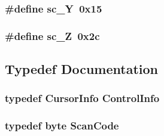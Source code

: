 \label{ID__IN_8H_a304f258a8d166ad1d2209daf57fc4db3}
\hypertarget{ID__IN_8H_a5f6c1e65d11139cad55c9235f7cc3825}{
\subsubsection[{sc\_\-Y}]{\setlength{\rightskip}{0pt plus 5cm}\#define sc\_\-Y~0x15}}
\label{ID__IN_8H_a5f6c1e65d11139cad55c9235f7cc3825}
\hypertarget{ID__IN_8H_abdfe2ea5cfd62dcfa591abdcaed59e6d}{
\subsubsection[{sc\_\-Z}]{\setlength{\rightskip}{0pt plus 5cm}\#define sc\_\-Z~0x2c}}
\label{ID__IN_8H_abdfe2ea5cfd62dcfa591abdcaed59e6d}


\subsection{Typedef Documentation}
\hypertarget{ID__IN_8H_ae2fe25e28b168383aaa3ab117709fd1c}{
\subsubsection[{ControlInfo}]{\setlength{\rightskip}{0pt plus 5cm}typedef {\bf CursorInfo} {\bf ControlInfo}}}
\label{ID__IN_8H_ae2fe25e28b168383aaa3ab117709fd1c}
\hypertarget{ID__IN_8H_a92ee9291fc7e992c1662c4e195242f2d}{
\subsubsection[{ScanCode}]{\setlength{\rightskip}{0pt plus 5cm}typedef {\bf byte} {\bf ScanCode}}}
\label{ID__IN_8H_a92ee9291fc7e992c1662c4e195242f2d}


